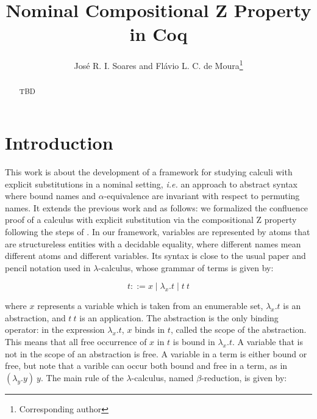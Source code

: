 \documentclass{llncs}
\begin{document}
\title{Nominal Compositional Z Property in Coq}
\author{José R. I. Soares 
  and
  Flávio L. C. de Moura\thanks{Corresponding author}
  }

\maketitle

\begin{abstract}
  TBD
\end{abstract}

\section{Introduction}

This work is about the development of a framework for studying calculi with explicit substitutions in a nominal setting\cite{gabbayNewApproachAbstract2002}, \emph{i.e.} an approach to abstract syntax where bound names and $\alpha$-equivalence are invariant with respect to permuting names. It extends the previous work \cite{fmm2021} and \cite{limaFormalizedExtensionSubstitution2023} as follows: we formalized the confluence proof of a calculus with explicit substitution via the compositional Z property following the steps of \cite{nakazawaCompositionalConfluenceProofs2016}. In our framework, variables are represented by atoms that are structureless entities with a decidable equality, where different names mean different atoms and different variables. Its syntax is close to the usual paper and pencil notation used in $\lambda$-calculus, whose grammar of terms is given by:

\begin{equation}\label{lambda:grammar}
 t ::= x \mid \lambda_x.t \mid t\ t
\end{equation}

\noindent where $x$ represents a variable which is taken from an enumerable set, $\lambda_x.t$ is an abstraction, and $t\ t$ is an application. The abstraction is the only binding operator: in the expression $\lambda_x.t$, $x$ binds in $t$, called the scope of the abstraction. This means that all free occurrence of $x$ in $t$ is bound in $\lambda_x.t$. A variable that is not in the scope of an abstraction is free. A variable in a term is either bound or free, but note that a varible can occur both bound and free in a term, as in $(\lambda_y. y)\ y$. The main rule of the $\lambda$-calculus, named $\beta$-reduction, is given by:
\end{document}
